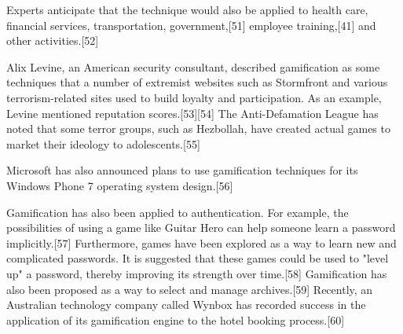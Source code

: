 Experts anticipate that the technique would also be applied to health care, financial services, transportation, government,[51] employee training,[41] and other activities.[52]

Alix Levine, an American security consultant, described gamification as some techniques that a number of extremist websites such as Stormfront and various terrorism-related sites used to build loyalty and participation. As an example, Levine mentioned reputation scores.[53][54] The Anti-Defamation League has noted that some terror groups, such as Hezbollah, have created actual games to market their ideology to adolescents.[55]

Microsoft has also announced plans to use gamification techniques for its Windows Phone 7 operating system design.[56]

Gamification has also been applied to authentication. For example, the possibilities of using a game like Guitar Hero can help someone learn a password implicitly.[57] Furthermore, games have been explored as a way to learn new and complicated passwords. It is suggested that these games could be used to "level up" a password, thereby improving its strength over time.[58] Gamification has also been proposed as a way to select and manage archives.[59] Recently, an Australian technology company called Wynbox has recorded success in the application of its gamification engine to the hotel booking process.[60]




